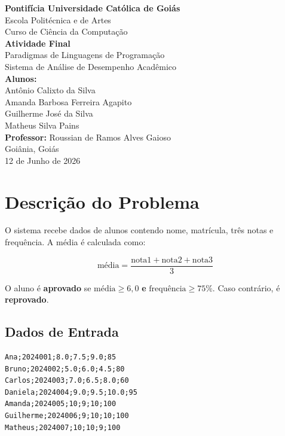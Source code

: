 \documentclass[12pt, a4paper]{article}
\begin{document}
\begin{titlepage}
    \centering
    \vspace*{2cm}
    {\Large\textbf{Pontifícia Universidade Católica de Goiás}}\\[0.5cm]
    {\large Escola Politécnica e de Artes}\\[0.3cm]
    {\large Curso de Ciência da Computação}\\[3cm]
    {\LARGE\textbf{Atividade Final}}\\[0.5cm]
    {\Large Paradigmas de Linguagens de Programação}\\[0.3cm]
    {\large Sistema de Análise de Desempenho Acadêmico}\\[3cm]
    {\large\textbf{Alunos:}}\\[0.3cm]
    {\Large Antônio Calixto da Silva}\\
    {\large Amanda Barbosa Ferreira Agapito}\\
    {\large Guilherme José da Silva}\\
    {\large Matheus Silva Pains}\\[2cm]
    {\large\textbf{Professor:} Roussian de Ramos Alves Gaioso}\\[0.5cm]
    {\large Goiânia, Goiás}\\
    {\large 12 de Junho de 2026}
\end{titlepage}

\tableofcontents
\newpage

\section{Descrição do Problema}

O sistema recebe dados de alunos contendo nome, matrícula, três notas e frequência. A média é calculada como:

\[
\text{média} = \frac{\text{nota1} + \text{nota2} + \text{nota3}}{3}
\]

O aluno é \textbf{aprovado} se $\text{média} \geq 6{,}0$ \textbf{e} $\text{frequência} \geq 75\%$. Caso contrário, é \textbf{reprovado}.

\subsection{Dados de Entrada}

\begin{lstlisting}[style=output]
Ana;2024001;8.0;7.5;9.0;85
Bruno;2024002;5.0;6.0;4.5;80
Carlos;2024003;7.0;6.5;8.0;60
Daniela;2024004;9.0;9.5;10.0;95
Amanda;2024005;10;9;10;100
Guilherme;2024006;9;10;10;100
Matheus;2024007;10;10;9;100
\end{lstlisting}
\end{document}

